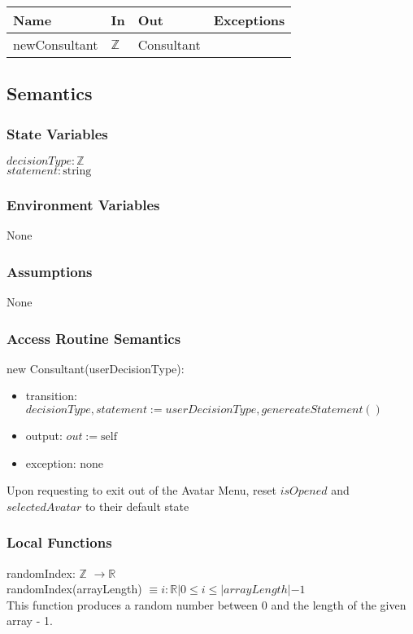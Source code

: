 \documentclass[12pt, titlepage]{article}
\begin{document}
\begin{center}
\begin{tabular}{p{3cm} p{4cm} p{4cm} p{2cm}}
\hline
\textbf{Name} & \textbf{In} & \textbf{Out} & \textbf{Exceptions} \\
\hline
newConsultant & $\mathbb{Z}$ & Consultant & \\
\hline

\end{tabular}
\end{center}

\subsection{Semantics}

\subsubsection{State Variables}
$\mathit{decisionType}: \text{$\mathbb{Z}$}$\\
$\mathit{statement}: \text{string}$\\
\subsubsection{Environment Variables}
None

\subsubsection{Assumptions}
None

\subsubsection{Access Routine Semantics}

\noindent new Consultant(userDecisionType):
\begin{itemize}
\item transition: $\mathit{decisionType, statement}:= userDecisionType, genereateStatement()$
\item output: $out := \mbox{self}$
\item exception: none
\end{itemize}


Upon requesting to exit out of the Avatar Menu, reset $isOpened$ and $selectedAvatar$ to their default state 

\subsubsection{Local Functions}
randomIndex: $\mathbb{Z}$ $\rightarrow \mathbb{R}$  \\
randomIndex(arrayLength) $\equiv i : \mathbb{R} | 0 \le i \le |arrayLength| - 1 $ \\
This function produces a random number between 0 and the length of the given array - 1. \\
\end{document}
